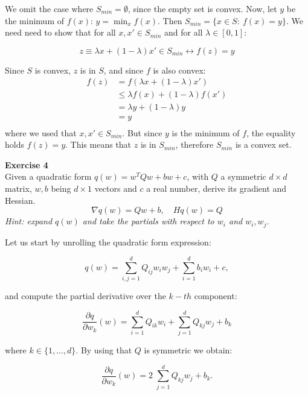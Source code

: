 \documentclass[11pt,table]{article}
\newenvironment{problem}[2][Exercise]
{ \begin{mdframed}[backgroundcolor=gray!20] \textbf{#1 #2} \\}
	{  \end{mdframed}}
\begin{document}
	We omit the case where \(S_{min} = \emptyset\), since the empty set is convex. Now, let \(y\) be the minimum of \(f(x)\): \(y = \min_x f(x)\). Then \( S_{min} = \{x \in S : \ f(x) = y \} \). We need need to show that for all \(x, x' \in S_{min}\) and for all \(\lambda \in [0,1]\):
	
	\[
	z \equiv \lambda x + (1-\lambda) x' \in S_{min} \leftrightarrow f(z) = y
	\]
	
	Since \(S\) is convex, \(z\) is in \(S\), and since \(f\) is also convex:
	\begin{align*}
		f(z) & = f\left(\lambda x + (1-\lambda) x'\right) \\
		& \leq \lambda f(x) + (1-\lambda) f(x')      \\
		& = \lambda y + (1-\lambda) y                \\
		& = y                                        \\
	\end{align*}
	where we used that \(x, x'\in S_{min}\). But since \(y\) is the minimum of \(f\), the equality holds \(f(z) = y\). This means that \(z\) is in \(S_{min}\), therefore \(S_{min}\) is a convex set.
	
	\begin{problem}{4}
		Given a quadratic form \( q(w) = w^TQw + bw + c \), with \( Q \) a symmetric \( d\times d \) matrix, \( w,b\) being \(d\times 1 \) vectors and \( c \) a real number, derive its gradient and Hessian.
		\[
		\nabla q(w) = Qw + b, \quad Hq(w) = Q
		\]
		\emph{Hint: expand \(q(w)\) and take the partials with respect to \(w_i\) and \(w_i,w_j\).}
	\end{problem}
	
	Let us start by unrolling the quadratic form expression:
	
	\[
	q(w) = \sum_{i,j=1}^{d} Q_{ij} w_{i}w_{j} + \sum_{i=1}^{d}b_{i}w_{i} + c,
	\]
	
	and compute the partial derivative over the \(k-th\) component:
	
	\[
	\frac{\partial q}{\partial w_k} (w) = \sum_{i=1}^{d} Q_{ik} w_{i} + \sum_{j=1}^{d} Q_{kj} w_{j} + b_{k}
	\]
	
	where \(k \in \{1, \ldots, d\}\). By using that \(Q\) is symmetric we obtain:
	
	\begin{equation}
		\label{eq-4}
		\frac{\partial q}{\partial w_k} (w) = 2 \; \sum_{j=1}^{d} Q_{kj} w_{j} + b_{k}.
	\end{equation}
	
\end{document}
